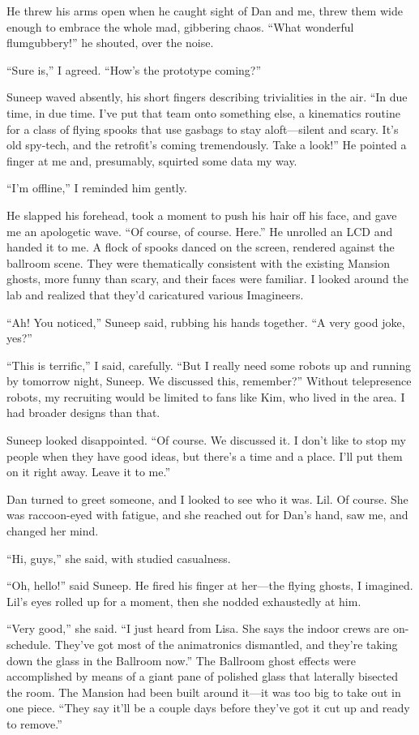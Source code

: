 He threw his arms open when he caught sight of Dan and me, threw
them wide enough to embrace the whole mad, gibbering chaos. “What
wonderful flumgubbery!” he shouted, over the noise.

“Sure is,” I agreed. “How's the prototype coming?”

Suneep waved absently, his short fingers describing trivialities in
the air. “In due time, in due time. I've put that team onto
something else, a kinematics routine for a class of flying spooks
that use gasbags to stay aloft—silent and scary. It's old spy-tech,
and the retrofit's coming tremendously. Take a look!” He pointed a
finger at me and, presumably, squirted some data my way.

“I'm offline,” I reminded him gently.

He slapped his forehead, took a moment to push his hair off his
face, and gave me an apologetic wave. “Of course, of course. Here.”
He unrolled an LCD and handed it to me. A flock of spooks danced on
the screen, rendered against the ballroom scene. They were
thematically consistent with the existing Mansion ghosts, more
funny than scary, and their faces were familiar. I looked around
the lab and realized that they'd caricatured various Imagineers.

“Ah! You noticed,” Suneep said, rubbing his hands together. “A very
good joke, yes?”

“This is terrific,” I said, carefully. “But I really need some
robots up and running by tomorrow night, Suneep. We discussed this,
remember?” Without telepresence robots, my recruiting would be
limited to fans like Kim, who lived in the area. I had broader
designs than that.

Suneep looked disappointed. “Of course. We discussed it. I don't
like to stop my people when they have good ideas, but there's a
time and a place. I'll put them on it right away. Leave it to me.”

Dan turned to greet someone, and I looked to see who it was. Lil.
Of course. She was raccoon-eyed with fatigue, and she reached out
for Dan's hand, saw me, and changed her mind.

“Hi, guys,” she said, with studied casualness.

“Oh, hello!” said Suneep. He fired his finger at her—the flying
ghosts, I imagined. Lil's eyes rolled up for a moment, then she
nodded exhaustedly at him.

“Very good,” she said. “I just heard from Lisa. She says the indoor
crews are on-schedule. They've got most of the animatronics
dismantled, and they're taking down the glass in the Ballroom now.”
The Ballroom ghost effects were accomplished by means of a giant
pane of polished glass that laterally bisected the room. The
Mansion had been built around it—it was too big to take out in one
piece. “They say it'll be a couple days before they've got it cut
up and ready to remove.”

